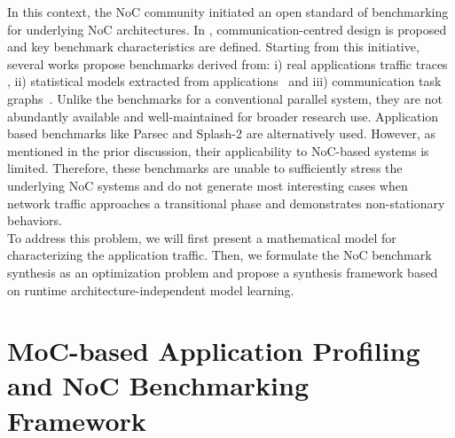 \indent In this context, the NoC community initiated an open standard of benchmarking for underlying NoC architectures. In \cite{grecu2007towards}\cite{salminen2005requirements}\cite{salminen2008network}, communication-centred design is proposed and key benchmark characteristics are defined. Starting from this initiative, several works propose benchmarks derived from: i) real applications traffic traces \cite{liu2011noc}\cite{hestness2010netrace}, ii) statistical models extracted from applications~\cite{soteriou2006statistical} and iii) communication task graphs~\cite{pekkarinen2011set}\cite{wang2014systematic}. Unlike the benchmarks for a conventional parallel system, they are not abundantly available and well-maintained for broader research use.  Application based benchmarks like Parsec and Splash-2 are alternatively used. However, as mentioned in the prior discussion,  their applicability to NoC-based systems is limited. Therefore, these benchmarks are unable to sufficiently stress the underlying NoC systems and do not generate most interesting cases when network traffic approaches a transitional phase and demonstrates non-stationary behaviors.\\
\indent To address this problem, we will first present a mathematical model for characterizing the application traffic. Then, we formulate the NoC benchmark synthesis as an optimization problem and propose a    synthesis framework based on runtime architecture-independent model learning.
\section{MoC-based Application Profiling and NoC Benchmarking Framework}
